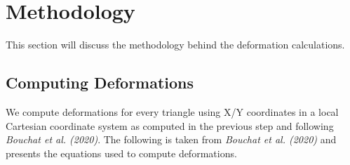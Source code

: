\documentclass[12pt]{article}
\begin{document}
\section{Methodology}

This section will discuss the methodology behind the deformation calculations.

\subsection{Computing Deformations}

We compute deformations for every triangle using X/Y coordinates in a local Cartesian coordinate system as computed in the previous step and following \textit{Bouchat et al. (2020)}. The following is taken from \textit{Bouchat et al. (2020)} and presents the equations used to compute deformations.
\end{document}
